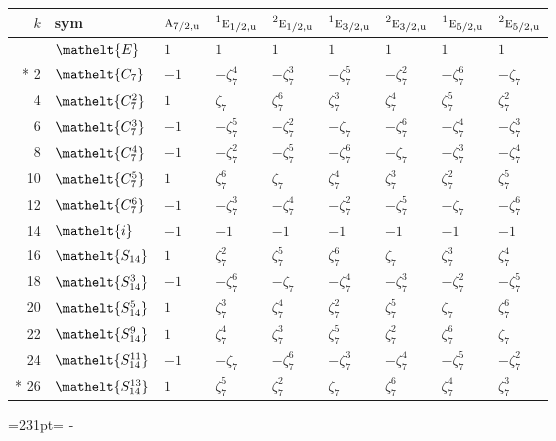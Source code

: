 \documentclass[10pt,a4paper]{article}
\newcommand{\needspace}[1]{\par\penalty-100\begingroup\dimen0=#1\relax\dimen2=\pagegoal
  \advance\dimen2-\pagetotal\ifdim\dimen0>\dimen2\relax\ifdim\dimen2>0pt\vfil\break\fi\fi
  \endgroup}
\numberwithin{equation}{section}
\newcommand{\eltfont}[1]{{\let\sigma\eltsigma\mathelt{#1}}}
\newcommand{\irr}[1]{\text{\normalfont\scshape #1}}
\newcommand{\conjpair}[1]{{}^{#1}}
\newcommand{\cls}[1]{\eltfont{#1}}
\newcommand{\ptag}[1]{\mathrm{#1}}
\newcommand{\rootunity}[1]{\zeta_{#1}}
\begin{document}
{\small\setlength{\tabcolsep}{4pt}
\begin{longtable}{@{}rllllllll@{}}\toprule
$k$ & sym & $\irr{a}_{7/2,\ptag{u}}$ & $\conjpair{1}\irr{e}_{1/2,\ptag{u}}$ & $\conjpair{2}\irr{e}_{1/2,\ptag{u}}$ & $\conjpair{1}\irr{e}_{3/2,\ptag{u}}$ & $\conjpair{2}\irr{e}_{3/2,\ptag{u}}$ & $\conjpair{1}\irr{e}_{5/2,\ptag{u}}$ & $\conjpair{2}\irr{e}_{5/2,\ptag{u}}$\\\midrule\endhead
\bottomrule\endfoot\endlastfoot
0 & $\cls{E}$ & $1$ & $1$ & $1$ & $1$ & $1$ & $1$ & $1$\\*
2 & $\cls{C_{7}}$ & $-1$ & $-\rootunity{7}^{4}$ & $-\rootunity{7}^{3}$ & $-\rootunity{7}^{5}$ & $-\rootunity{7}^{2}$ & $-\rootunity{7}^{6}$ & $-\rootunity{7}$\\
4 & $\cls{C_{7}^{2}}$ & $1$ & $\rootunity{7}$ & $\rootunity{7}^{6}$ & $\rootunity{7}^{3}$ & $\rootunity{7}^{4}$ & $\rootunity{7}^{5}$ & $\rootunity{7}^{2}$\\
6 & $\cls{C_{7}^{3}}$ & $-1$ & $-\rootunity{7}^{5}$ & $-\rootunity{7}^{2}$ & $-\rootunity{7}$ & $-\rootunity{7}^{6}$ & $-\rootunity{7}^{4}$ & $-\rootunity{7}^{3}$\\
8 & $\cls{C_{7}^{4}}$ & $-1$ & $-\rootunity{7}^{2}$ & $-\rootunity{7}^{5}$ & $-\rootunity{7}^{6}$ & $-\rootunity{7}$ & $-\rootunity{7}^{3}$ & $-\rootunity{7}^{4}$\\
10 & $\cls{C_{7}^{5}}$ & $1$ & $\rootunity{7}^{6}$ & $\rootunity{7}$ & $\rootunity{7}^{4}$ & $\rootunity{7}^{3}$ & $\rootunity{7}^{2}$ & $\rootunity{7}^{5}$\\
12 & $\cls{C_{7}^{6}}$ & $-1$ & $-\rootunity{7}^{3}$ & $-\rootunity{7}^{4}$ & $-\rootunity{7}^{2}$ & $-\rootunity{7}^{5}$ & $-\rootunity{7}$ & $-\rootunity{7}^{6}$\\
14 & $\cls{i}$ & $-1$ & $-1$ & $-1$ & $-1$ & $-1$ & $-1$ & $-1$\\
16 & $\cls{S_{14}}$ & $1$ & $\rootunity{7}^{2}$ & $\rootunity{7}^{5}$ & $\rootunity{7}^{6}$ & $\rootunity{7}$ & $\rootunity{7}^{3}$ & $\rootunity{7}^{4}$\\
18 & $\cls{S_{14}^{3}}$ & $-1$ & $-\rootunity{7}^{6}$ & $-\rootunity{7}$ & $-\rootunity{7}^{4}$ & $-\rootunity{7}^{3}$ & $-\rootunity{7}^{2}$ & $-\rootunity{7}^{5}$\\
20 & $\cls{S_{14}^{5}}$ & $1$ & $\rootunity{7}^{3}$ & $\rootunity{7}^{4}$ & $\rootunity{7}^{2}$ & $\rootunity{7}^{5}$ & $\rootunity{7}$ & $\rootunity{7}^{6}$\\
22 & $\cls{S_{14}^{9}}$ & $1$ & $\rootunity{7}^{4}$ & $\rootunity{7}^{3}$ & $\rootunity{7}^{5}$ & $\rootunity{7}^{2}$ & $\rootunity{7}^{6}$ & $\rootunity{7}$\\
24 & $\cls{S_{14}^{11}}$ & $-1$ & $-\rootunity{7}$ & $-\rootunity{7}^{6}$ & $-\rootunity{7}^{3}$ & $-\rootunity{7}^{4}$ & $-\rootunity{7}^{5}$ & $-\rootunity{7}^{2}$\\*
26 & $\cls{S_{14}^{13}}$ & $1$ & $\rootunity{7}^{5}$ & $\rootunity{7}^{2}$ & $\rootunity{7}$ & $\rootunity{7}^{6}$ & $\rootunity{7}^{4}$ & $\rootunity{7}^{3}$\\
\bottomrule\end{longtable}}
\needspace{231pt}
\end{document}
